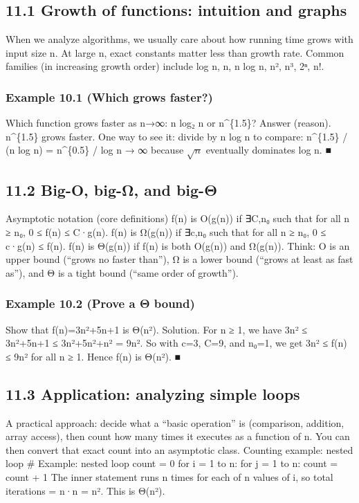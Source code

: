\documentclass[11pt]{article}
\begin{document}
\subsection{11.1 Growth of functions: intuition and graphs}
When we analyze algorithms, we usually care about how running time grows with input
size n. At large n, exact constants matter less than growth rate. Common families (in
increasing growth order) include log n, n, n log n, n², n³, 2ⁿ, n!.
\subsubsection*{Example 10.1 (Which grows faster?)}
Which function grows faster as n→∞: n log₂ n or n\textasciicircum{}\{1.5\}?
Answer (reason). n\textasciicircum{}\{1.5\} grows faster. One way to see it: divide by n log n to
compare:
n\textasciicircum{}\{1.5\} / (n log n) = n\textasciicircum{}\{0.5\} / log n → ∞ because \(\sqrt{n}\) eventually dominates log n.
■
\subsection{11.2 Big-O, big-Ω, and big-Θ}
Asymptotic notation (core definitions)
f(n) is O(g(n)) if ∃C,n₀ such that for all n ≥ n₀, 0 ≤ f(n) ≤ C·g(n).
f(n) is Ω(g(n)) if ∃c,n₀ such that for all n ≥ n₀, 0 ≤ c·g(n) ≤ f(n).
f(n) is Θ(g(n)) if f(n) is both O(g(n)) and Ω(g(n)).
Think: O is an upper bound (“grows no faster than”), Ω is a lower bound (“grows at least
as fast as”), and Θ is a tight bound (“same order of growth”).

\subsubsection*{Example 10.2 (Prove a Θ bound)}
Show that f(n)=3n²+5n+1 is Θ(n²).
Solution. For n ≥ 1, we have 3n² ≤ 3n²+5n+1 ≤ 3n²+5n²+n² = 9n².
So with c=3, C=9, and n₀=1, we get 3n² ≤ f(n) ≤ 9n² for all n ≥ 1.
Hence f(n) is Θ(n²). ■
\subsection{11.3 Application: analyzing simple loops}
A practical approach: decide what a “basic operation” is (comparison, addition, array
access), then count how many times it executes as a function of n. You can then convert
that exact count into an asymptotic class.
Counting example: nested loop
\# Example: nested loop
count = 0
for i = 1 to n:
    for j = 1 to n:
        count = count + 1
The inner statement runs n times for each of n values of i, so total iterations = n·n = n².
This is Θ(n²).
\end{document}
